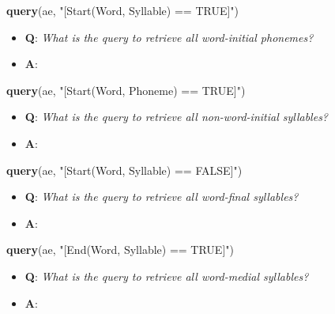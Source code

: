 \documentclass[]{book}
\newenvironment{Shaded}{\begin{snugshade}}{\end{snugshade}}
\newcommand{\KeywordTok}[1]{\textcolor[rgb]{0.13,0.29,0.53}{\textbf{#1}}}
\newcommand{\NormalTok}[1]{#1}
\newcommand{\StringTok}[1]{\textcolor[rgb]{0.31,0.60,0.02}{#1}}
\providecommand{\tightlist}{%
  \setlength{\itemsep}{0pt}\setlength{\parskip}{0pt}}
\theoremstyle{definition}
\theoremstyle{definition}
\theoremstyle{definition}
\theoremstyle{remark}
\begin{document}
\begin{Shaded}
\begin{Highlighting}[]
\KeywordTok{query}\NormalTok{(ae, }\StringTok{"[Start(Word, Syllable) == TRUE]"}\NormalTok{)}
\end{Highlighting}
\end{Shaded}

\begin{itemize}
\tightlist
\item
  \textbf{Q}: \emph{What is the query to retrieve all word-initial
  phonemes?}
\item
  \textbf{A}:
\end{itemize}

\begin{Shaded}
\begin{Highlighting}[]
\KeywordTok{query}\NormalTok{(ae, }\StringTok{"[Start(Word, Phoneme) == TRUE]"}\NormalTok{)}
\end{Highlighting}
\end{Shaded}

\begin{itemize}
\tightlist
\item
  \textbf{Q}: \emph{What is the query to retrieve all non-word-initial
  syllables?}
\item
  \textbf{A}:
\end{itemize}

\begin{Shaded}
\begin{Highlighting}[]
\KeywordTok{query}\NormalTok{(ae, }\StringTok{"[Start(Word, Syllable) == FALSE]"}\NormalTok{)}
\end{Highlighting}
\end{Shaded}

\begin{itemize}
\tightlist
\item
  \textbf{Q}: \emph{What is the query to retrieve all word-final
  syllables?}
\item
  \textbf{A}:
\end{itemize}

\begin{Shaded}
\begin{Highlighting}[]
\KeywordTok{query}\NormalTok{(ae, }\StringTok{"[End(Word, Syllable) == TRUE]"}\NormalTok{)}
\end{Highlighting}
\end{Shaded}

\begin{itemize}
\tightlist
\item
  \textbf{Q}: \emph{What is the query to retrieve all word-medial
  syllables?}
\item
  \textbf{A}:
\end{itemize}
\end{document}

